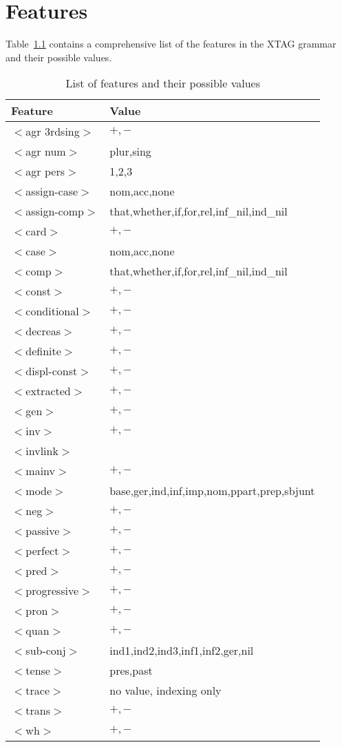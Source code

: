 \chapter{Features}
\label{features}

Table~\ref{feature-table} contains a comprehensive list of the features in the
XTAG grammar and their possible values.

\footnotesize
\begin{table}[hbt]
\centering
\begin{tabular}{|l|l|}
\hline
Feature&Value\\
\hline
\hline
$<$agr 3rdsing$>$&$+,-$\\
$<$agr num$>$&plur,sing\\
$<$agr pers$>$&1,2,3\\
$<$assign-case$>$&nom,acc,none\\
$<$assign-comp$>$&that,whether,if,for,rel,inf\_nil,ind\_nil\\
$<$card$>$&$+,-$\\
$<$case$>$&nom,acc,none\\
$<$comp$>$&that,whether,if,for,rel,inf\_nil,ind\_nil\\
$<$const$>$&$+,-$\\
$<$conditional$>$&$+,-$\\
$<$decreas$>$&$+,-$\\
$<$definite$>$&$+,-$\\
$<$displ-const$>$&$+,-$\\
$<$extracted$>$&$+,-$\\
$<$gen$>$&$+,-$\\
$<$inv$>$&$+,-$\\
$<$invlink$>$&\\
$<$mainv$>$&$+,-$\\
$<$mode$>$&base,ger,ind,inf,imp,nom,ppart,prep,sbjunt\\
$<$neg$>$&$+,-$\\
$<$passive$>$&$+,-$\\
$<$perfect$>$&$+,-$\\
$<$pred$>$&$+,-$\\
$<$progressive$>$&$+,-$\\
$<$pron$>$&$+,-$\\
$<$quan$>$&$+,-$\\
$<$sub-conj$>$&ind1,ind2,ind3,inf1,inf2,ger,nil\\
$<$tense$>$&pres,past\\
$<$trace$>$&no value, indexing only\\
$<$trans$>$&$+,-$\\
$<$wh$>$&$+,-$\\
\hline
\end{tabular}
\caption{List of features and their possible values}
\label{feature-table}
\end{table}

\normalsize

